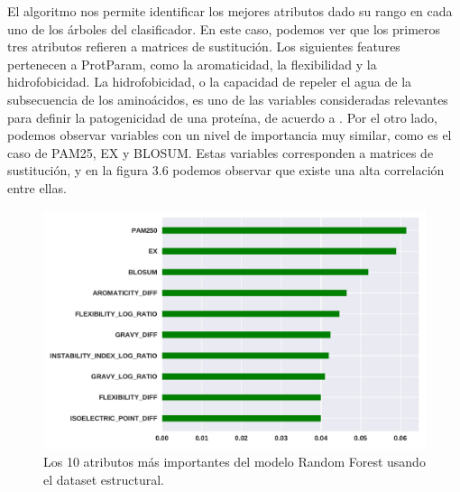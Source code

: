 
El algoritmo nos permite identificar los mejores atributos dado su rango en cada uno de los árboles del clasificador. En este caso, podemos ver que los primeros tres atributos refieren a matrices de sustitución. Los siguientes features pertenecen a ProtParam, como la aromaticidad, la flexibilidad y la hidrofobicidad. La hidrofobicidad, o la capacidad de repeler el agua de la subsecuencia de los aminoácidos, es uno de las variables consideradas relevantes para definir la patogenicidad de una proteína, de acuerdo a \cite{Wang2016}. Por el otro lado, podemos observar variables con un nivel de importancia muy similar, como es el caso de PAM25, EX y BLOSUM. Estas variables corresponden a matrices de sustitución, y en la figura 3.6 podemos observar que existe una alta correlación entre ellas.  

\begin{figure}[H]
    \centering
    \includegraphics[scale=0.55]{documents/latex/figures/3/importance_1.pdf}
    \caption{Los 10 atributos más importantes del modelo Random Forest usando el dataset estructural. }
    \label{fig:importance_1}
\end{figure}




